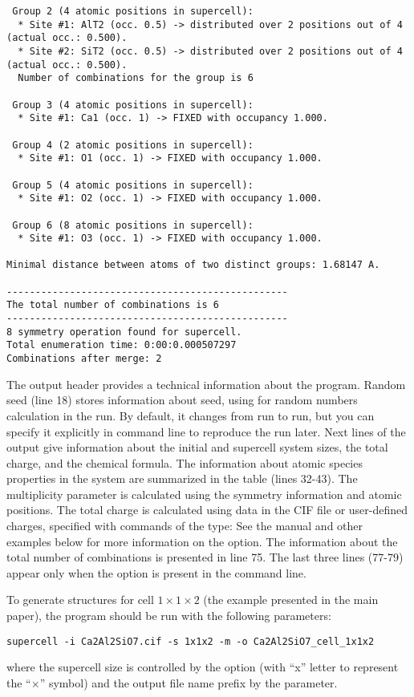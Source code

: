 \documentclass[a4paper,10pt]{article}
\begin{document}
\begin{verbatim}
 Group 2 (4 atomic positions in supercell):
  * Site #1: AlT2 (occ. 0.5) -> distributed over 2 positions out of 4 (actual occ.: 0.500).
  * Site #2: SiT2 (occ. 0.5) -> distributed over 2 positions out of 4 (actual occ.: 0.500).
  Number of combinations for the group is 6

 Group 3 (4 atomic positions in supercell):
  * Site #1: Ca1 (occ. 1) -> FIXED with occupancy 1.000.

 Group 4 (2 atomic positions in supercell):
  * Site #1: O1 (occ. 1) -> FIXED with occupancy 1.000.

 Group 5 (4 atomic positions in supercell):
  * Site #1: O2 (occ. 1) -> FIXED with occupancy 1.000.

 Group 6 (8 atomic positions in supercell):
  * Site #1: O3 (occ. 1) -> FIXED with occupancy 1.000.

Minimal distance between atoms of two distinct groups: 1.68147 A.

-------------------------------------------------
The total number of combinations is 6
-------------------------------------------------
8 symmetry operation found for supercell.
Total enumeration time: 0:00:0.000507297
Combinations after merge: 2
\end{verbatim}

The output header provides a technical information about the program. Random seed (line 18) stores information about seed, using for random numbers calculation in the run. By default, it changes from run to run, but you can specify it explicitly in command line to reproduce the run later. 
Next lines of the output give information about the initial and supercell system sizes, the total charge, and the chemical formula. The information about atomic species properties in the system are summarized in the table (lines 32-43). The multiplicity parameter is calculated using the symmetry information and atomic positions. The total charge is calculated using  data in the CIF file or user-defined charges, specified with commands of the type:
See the manual and other examples below for more information on the  option. The information about the total number of combinations is presented in line 75. The last three lines (77-79) appear only when the  option is present in the command line. 

To generate structures for cell $1\times1\times2$ (the example presented in the main paper), the \sups{} program should be run with the following parameters:
\begin{Verbatim}[breaklines]
supercell -i Ca2Al2SiO7.cif -s 1x1x2 -m -o Ca2Al2SiO7_cell_1x1x2
\end{Verbatim}
where the supercell size is controlled by the  option (with ``x'' letter to represent the ``$\times$'' symbol) and the output file name prefix by the  parameter.
\end{document}
